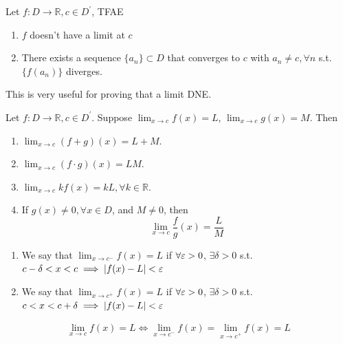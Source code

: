 \begin{corollary}
    Let $f: D \to \mathbb{R}, c \in D^{\prime}$, TFAE
    \begin{enumerate}
        \item $f$ doesn't have a limit at $c$
        \item There exists a sequence $\{ a_n \}  \subset D$
        that converges to $c$ with $a_n \neq c, \forall n$ s.t. 
        $\{ f(a_n) \} $ diverges.
    \end{enumerate} 
\end{corollary}

\begin{remark}
This is very useful for proving that a limit DNE.
\end{remark}

\begin{proposition}
    Let $f: D \to \mathbb{R}, c \in D^{\prime}$. 
    Suppose $\lim_{x \to c}f(x) = L$,
    $\lim_{x \to c}g(x) = M$. 
    Then 
    \begin{enumerate}
        \item $\lim_{x \to c}(f+ g) (x) = L + M$.
        \item $\lim_{x \to c}(f\cdot g) (x) = LM$.
        \item $\lim_{x \to c}kf(x) = kL, \forall k \in \mathbb{R}$.
        \item If $g(x) \neq 0, \forall x \in D$, and $M \neq 0$, then 
        \[
            \lim_{x \to c} \frac{f}{g}(x) = \frac{L}{M}
        \]
    \end{enumerate} 
\end{proposition}

\begin{definition}
    \hfill
    \begin{enumerate}
        \item We say that $\lim_{x \to c^-}f(x) = L$ if 
        $\forall \varepsilon > 0$, $\exists \delta > 0$ s.t. 
        $c - \delta < x < c \implies |f(x) - L | < \varepsilon$ 
        \item We say that $\lim_{x \to c^+}f(x) = L$ if 
        $\forall \varepsilon > 0$, $\exists \delta > 0$ s.t. 
        $c < x < c  + \delta\implies |f(x) - L | < \varepsilon$ 
    \end{enumerate} 
\end{definition}

\begin{proposition}
    \begin{align*}
        \lim_{x \to c}f(x) = L
        \iff
        \lim_{x \to c^-}f(x) =
        \lim_{x \to c^+}f(x) =
        L
    \end{align*}
\end{proposition}

